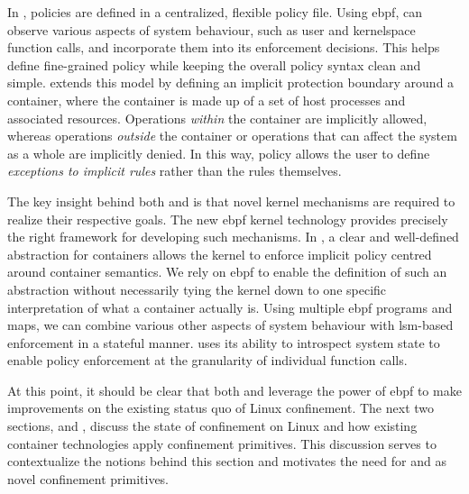 In \bpfbox{}, policies are defined in a centralized, flexible policy file. Using
\gls{ebpf}, \bpfbox{} can observe various aspects of system behaviour, such as user and
kernelspace function calls, and incorporate them into its enforcement decisions. This
helps define fine-grained policy while keeping the overall policy syntax clean and simple.
\bpfcontain{} extends this model by defining an implicit protection boundary around
a container, where the container is made up of a set of host processes and associated
resources. Operations \textit{within} the container are implicitly allowed, whereas
operations \textit{outside} the container or operations that can affect the system as
a whole are implicitly denied. In this way, \bpfcontain{} policy allows the user to define
\textit{exceptions to implicit rules} rather than the rules themselves.

The key insight behind both \bpfbox{} and \bpfcontain{} is that novel kernel mechanisms
are required to realize their respective goals. The new \gls{ebpf} kernel technology
provides precisely the right framework for developing such mechanisms. In \bpfcontain{},
a clear and well-defined abstraction for containers allows the kernel to enforce implicit
policy centred around container semantics. We rely on \gls{ebpf} to enable the definition
of such an abstraction without necessarily tying the kernel down to one specific
interpretation of what a container actually is. Using multiple \gls{ebpf} programs and
maps, we can combine various other aspects of system behaviour with \gls{lsm}-based
enforcement in a stateful manner. \bpfbox{} uses its ability to introspect system state to
enable policy enforcement at the granularity of individual function calls.

At this point, it should be clear that both \bpfbox{} and \bpfcontain{} leverage the power
of \gls{ebpf} to make improvements on the existing status quo of Linux confinement. The
next two sections,  and , discuss the state of
confinement on Linux and how existing container technologies apply confinement primitives.
This discussion serves to contextualize the notions behind this section and motivates the
need for \bpfbox{} and \bpfcontain{} as novel confinement primitives.

